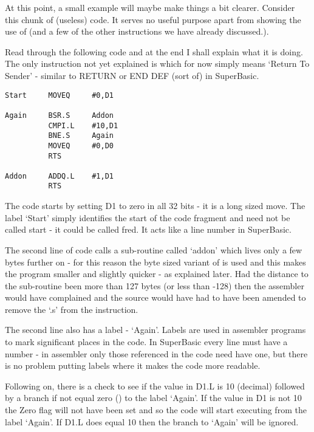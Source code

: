 At this point, a small example will maybe make things a bit clearer.
    Consider this chunk of (useless) code. It serves no useful purpose apart
    from showing the use of  (and a few of the other instructions we have
    already discussed.).

Read through the following code and at the end I shall explain what
    it is doing. The only instruction not yet explained is  which for now
    simply means `Return To Sender' -{} similar to RETURN or END DEF (sort of)
    in SuperBasic.

\begin{lstlisting}[firstnumber=1,caption={BSR Example}]
Start     MOVEQ     #0,D1

Again     BSR.S     Addon
          CMPI.L    #10,D1
          BNE.S     Again
          MOVEQ     #0,D0
          RTS

Addon     ADDQ.L    #1,D1
          RTS
\end{lstlisting}

The code starts by setting D1 to zero in all 32 bits -{} it is a long
    sized move. The label `Start' simply identifies the start of the code
    fragment and need not be called start -{} it could be called fred. It acts
    like a line number in SuperBasic.

The second line of code calls a sub-{}routine called `addon' which
    lives only a few bytes further on -{} for this reason the byte sized variant
    of  is used and this makes the program smaller and slightly quicker -{}
    as explained later. Had the distance to the sub-{}routine been more than 127
    bytes (or less than -{}128) then the assembler would have complained and the
    source would have had to have been amended to remove the `.s' from the
    instruction.

The second line also has a label -{} `Again'. Labels are used in
    assembler programs to mark significant places in the code. In SuperBasic
    every line must have a number -{} in assembler only those referenced in the
    code need have one, but there is no problem putting labels where it makes
    the code more readable.

Following on, there is a check to see if the value in D1.L is 10
    (decimal) followed by a branch if not equal zero () to the label
    `Again'. If the value in D1 is not 10 the Zero flag will not have been set
    and so the code will start executing from the label `Again'. If D1.L does
    equal 10 then the branch to `Again' will be ignored.

